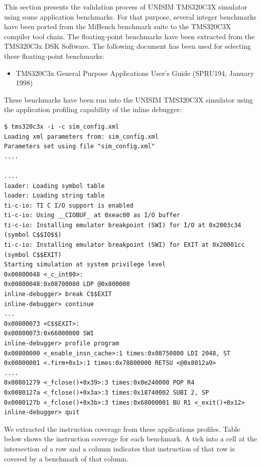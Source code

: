 This section presents the validation process of UNISIM TMS320C3X simulator using some application benchmarks.
For that purpose, several integer benchmarks have been ported from the MiBench benchmark suite to the TMS320C3X compiler tool chain.
The floating-point benchmarks have been extracted from the TMS320C3x DSK Software.
The following document has been used for selecting these floating-point benchmarks:
\begin{itemize}
\item TMS320C3x General Purpose Applications User's Guide (SPRU194, January 1998)
\end{itemize}

These benchmarks have been run into the UNISIM TMS320C3X simulator using the application profiling capability of the inline debugger:
\begin{verbatim}
$ tms320c3x -i -c sim_config.xml
Loading xml parameters from: sim_config.xml
Parameters set using file "sim_config.xml"
....

....
loader: Loading symbol table
loader: Loading string table
ti-c-io: TI C I/O support is enabled
ti-c-io: Using __CIOBUF_ at 0xeac00 as I/O buffer
ti-c-io: Installing emulator breakpoint (SWI) for I/O at 0x2003c34 (symbol C$$IO$$)
ti-c-io: Installing emulator breakpoint (SWI) for EXIT at 0x20001cc (symbol C$$EXIT)
Starting simulation at system privilege level
0x00800048 <_c_int00>:
0x00800048:0x08700080 LDP @0x800000
inline-debugger> break C$$EXIT
inline-debugger> continue
...
0x00800073 <C$$EXIT>:
0x00800073:0x66000000 SWI
inline-debugger> profile program
0x00800000 <_enable_insn_cache>:1 times:0x08750800 LDI 2048, ST                                                                                                                                      
0x00800001 <.firm+0x1>:1 times:0x78800000 RETSU <@0x8012a9>                                                                                                                                          
....
0x00801279 <_fclose()+0x39>:3 times:0x0e240000 POP R4
0x0080127a <_fclose()+0x3a>:3 times:0x18740002 SUBI 2, SP
0x0080127b <_fclose()+0x3b>:3 times:0x68000001 BU R1 <_exit()+0x12>
inline-debugger> quit
\end{verbatim}

We extracted the instruction coverage from these applications profiles. Table below shows the instruction coverage for each benchmark. A tick into a cell at the intersection of a row and a column indicates that instruction of that row is covered by a benchmark of that column.

